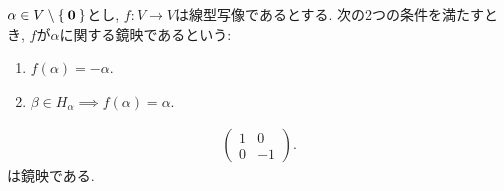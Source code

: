 \begin{definition}
  $\alpha \in V\setminus\Set{\boldsymbol{0}}$とし,
  $f\colon V\to V$は線型写像であるとする.
  次の2つの条件を満たすとき,
  $f$が$\alpha$に関する鏡映であるという:
  \begin{enumerate}
  \item $f(\alpha)=-\alpha$.
  \item $\beta \in H_\alpha \implies f(\alpha)=\alpha$.    
  \end{enumerate}
\end{definition}

\begin{example}
  \begin{align*}
    \begin{pmatrix}
      1 & 0 \\
      0 & -1 
    \end{pmatrix}.
  \end{align*}
は鏡映である.
\end{example}
